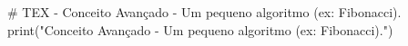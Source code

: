 # TEX - Conceito Avançado - Um pequeno algoritmo (ex: Fibonacci).
print("Conceito Avançado - Um pequeno algoritmo (ex: Fibonacci).")
